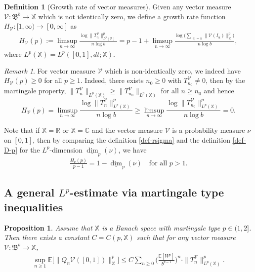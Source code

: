 \documentclass[12pt]{amsart}
\newtheorem{proposition}[theorem]{Proposition}
\theoremstyle{definition}
\newtheorem*{definition*}{Definition}
\theoremstyle{remark}
\newtheorem*{remark*}{Remark}
\newcommand{\R}{\mathbb{R}}
\newcommand{\C}{\mathbb{C}}
\newcommand{\E}{\mathbb{E}}
\newcommand{\fX}{\mathbb{X}}
\newcommand{\ldim}{\underline{\dim}}
\numberwithin{equation}{section}
\begin{document}
\begin{definition*}[Growth rate of vector measures]  Given any vector measure  $\mathcal{V}: \mathfrak{B}^b \rightarrow \fX$ which is not identically zero, we define  a growth rate function  $H_\mathcal{V}: [1, \infty) \rightarrow [0, \infty]$ as 
\begin{align}\label{def-rsigma}
H_\mathcal{V}(p):=  \limsup_{n\to\infty} \frac{\log \|T_n^\mathcal{V}\|_{L^p(\fX)}^p}{n \log b}  = p-1 + \limsup_{n\to\infty}\frac{ \log \Big(\sum_{|u|=n} \| \mathcal{V}(I_u)\|_{\fX}^p\Big)}{n\log b},
\end{align}
where $L^p(\fX) = L^p([0,1], dt; \fX)$.  
\end{definition*}

\begin{remark*}
For  vector measure $\mathcal{V}$ which is non-identically zero, we indeed have $H_\mathcal{V}(p) \ge 0$ for all $p\ge 1$. Indeed,  there exists $n_0\ge 0$ with $T_{n_0}^\mathcal{V}\ne 0$, then  by the martingale property, $\|T_n^\mathcal{V}\|_{L^p(\fX)} \ge \|T_{n_0}^\mathcal{V}\|_{L^p(\fX)}$ for all $n\ge n_0$ and hence 
\[
H_\mathcal{V}(p) =  \limsup_{n\to\infty} \frac{\log \|T_n^\mathcal{V}\|_{L^p(\fX)}^p}{n \log b} 
\ge   \limsup_{n\to\infty} \frac{\log \|T_{n_0}^\mathcal{V}\|_{L^p(\fX)}^p}{n \log b}  = 0.
\]
\end{remark*}



Note that  if $\fX= \R$ or $\fX=\C$ and   the vector measure $\mathcal{V}$ is a probability measure $\nu$ on $[0,1]$, then by comparing the definition \eqref{def-rsigma}  and the definition \eqref{def-D-p} for  the $L^p$-dimension $\ldim_p(\nu)$, we have 
\begin{align}\label{H=pdim}
\frac{H_\nu(p)}{p-1}=  1- \ldim_p(\nu) \quad \text{for all $p>1$}.
\end{align}









\subsection{A general $L^p$-estimate via martingale type inequalities}\label{sec-Mtype}


\begin{proposition}\label{prop-mart-type}
Assume that $\fX$ is a  Banach space   with martingale type  $p \in (1,2]$.  Then there exists a constant $C = C(p, \fX)$ such that for any  vector measure $\mathcal{V}: \mathfrak{B}^b \rightarrow \fX$, 
\begin{align}\label{sigma-mart-p}
\sup_{n\ge 1} \E\big[\big\|Q_n\mathcal{V}([0,1])\big\|_{\fX}^p\big] \le      C   \sum_{n\ge 0} \Big( \frac{\E[W^p]}{b^{p-1}}\Big)^n  \cdot    
\|T_n^\mathcal{V}\|_{L^p(\fX)}^p.
\end{align}
\end{proposition}
\end{document}
